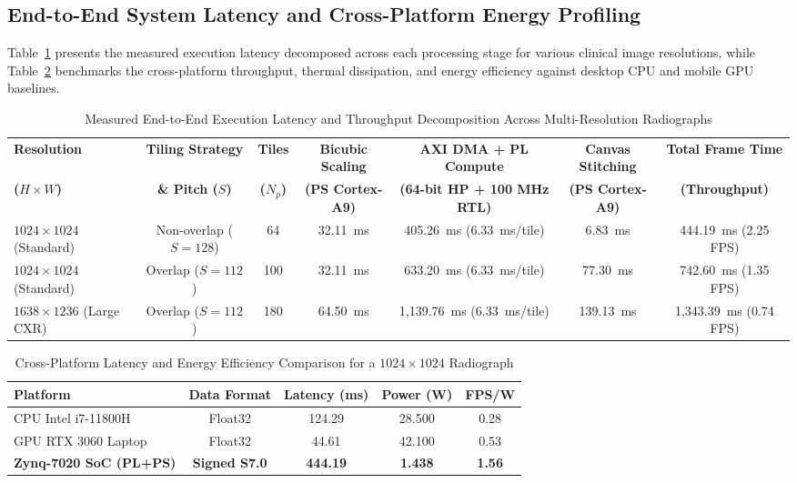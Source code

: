 \documentclass[conference]{IEEEtran}
\begin{document}
\subsection{End-to-End System Latency and Cross-Platform Energy Profiling}
\label{sec:latency_profiling}

Table~\ref{tab:latency_breakdown} presents the measured execution latency decomposed across each processing stage for various clinical image resolutions, while Table~\ref{tab:cross_platform} benchmarks the cross-platform throughput, thermal dissipation, and energy efficiency against desktop CPU and mobile GPU baselines.

\begin{table}[!t]
\caption{Measured End-to-End Execution Latency and Throughput Decomposition Across Multi-Resolution Radiographs}
\label{tab:latency_breakdown}
\centering
\small
\setlength{\tabcolsep}{7pt}
\begin{tabular}{lcccccc}
\toprule
\textbf{Resolution} & \textbf{Tiling Strategy} & \textbf{Tiles} & \textbf{Bicubic Scaling} & \textbf{AXI DMA + PL Compute} & \textbf{Canvas Stitching} & \textbf{Total Frame Time} \\
\textbf{($H \times W$)} & \textbf{\& Pitch ($S$)} & \textbf{($N_p$)} & \textbf{(PS Cortex-A9)} & \textbf{(64-bit HP + 100 MHz RTL)} & \textbf{(PS Cortex-A9)} & \textbf{(Throughput)} \\
\midrule
$1024 \times 1024$ (Standard) & Non-overlap ($S=128$) & 64 & 32.11~ms & 405.26~ms (6.33~ms/tile) & 6.83~ms & 444.19~ms (2.25 FPS) \\
$1024 \times 1024$ (Standard) & Overlap ($S=112$) & 100 & 32.11~ms & 633.20~ms (6.33~ms/tile) & 77.30~ms & 742.60~ms (1.35 FPS) \\
$1638 \times 1236$ (Large CXR) & Overlap ($S=112$) & 180 & 64.50~ms & 1,139.76~ms (6.33~ms/tile) & 139.13~ms & 1,343.39~ms (0.74 FPS) \\
\bottomrule
\end{tabular}
\end{table}

\begin{table}[!t]
\caption{Cross-Platform Latency and Energy Efficiency Comparison for a $1024 \times 1024$ Radiograph}
\label{tab:cross_platform}
\centering
\small
\setlength{\tabcolsep}{5pt}
\begin{tabular}{lcccc}
\toprule
\textbf{Platform} & \textbf{Data Format} & \textbf{Latency (ms)} & \textbf{Power (W)} & \textbf{FPS/W} \\
\midrule
CPU Intel i7-11800H & Float32 & 124.29 & 28.500 & 0.28 \\
GPU RTX 3060 Laptop & Float32 & 44.61 & 42.100 & 0.53 \\
\textbf{Zynq-7020 SoC (PL+PS)} & \textbf{Signed S7.0} & \textbf{444.19} & \textbf{1.438} & \textbf{1.56} \\
\bottomrule
\end{tabular}
\end{table}
\end{document}

